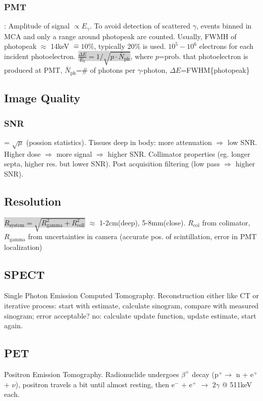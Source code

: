 \documentclass[9pt]{article}
\newcommand{\grey}[1]{\setlength{\fboxsep}{0pt}\colorbox{lightgrey}{#1}}
\begin{document}
\begin{multicols}{2}
\subsubsection{PMT}: Amplitude of signal $\propto E_\gamma$. To avoid detection of scattered $\gamma$, events binned in MCA and only a range around photopeak are counted. Usually, FWMH of photopeak $\approx$ 14keV $\hat{=} 10\%$, typically 20\% is used. $10^5-10^6$ electrons for each incident photoelectron. \grey{$\frac{\Delta E}{E_0} = 1/\sqrt{p \cdot \bar{N}_\mathrm{ph}}$}, where $p$=prob. that photoelectron is produced at PMT, $\bar{N}_\mathrm{ph}$=\# of photons per $\gamma$-photon, $\Delta E$=FWHM\{photopeak\}

\subsection{Image Quality}
\subsubsection{SNR} = $\sqrt{\mu}$ (possion statistics). Tissues deep in body: more attenuation $\Rightarrow$ low SNR. Higher dose $\Rightarrow$ more signal $\Rightarrow$ higher SNR. Collimator properties (eg. longer septa, higher res. but lower SNR). Post acquisition filtering (low pass $\Rightarrow$ higher SNR).

\subsection{Resolution}
\grey{$R_\mathrm{system} = \sqrt{R_\mathrm{gamma}^2 + R_\mathrm{coll}^2}$} $\approx$ 1-2cm(deep), 5-8mm(close). $R_\mathrm{col}$ from colimator, $R_\mathrm{gamma}$ from uncertainties in camera (accurate pos. of scintillation, error in PMT localization)

\subsection{SPECT} 
Single Photon Emission Computed Tomography. Reconstruction either like CT or iterative process: start with estimate, calculate sinogram, compare with measured sinogram; error acceptable? no: calculate update function, update estimate, start again.

\subsection{PET}
Positron Emission Tomography. Radionuclide undergoes $\beta^+$ decay (p${}^+ \rightarrow$ n + e${}^+$ + $\nu$), positron travels a bit until almost resting, then e${}^-$ + e${}^+$ $\rightarrow$ $2\gamma$ @ 511keV each.


\end{multicols}
\end{document}
